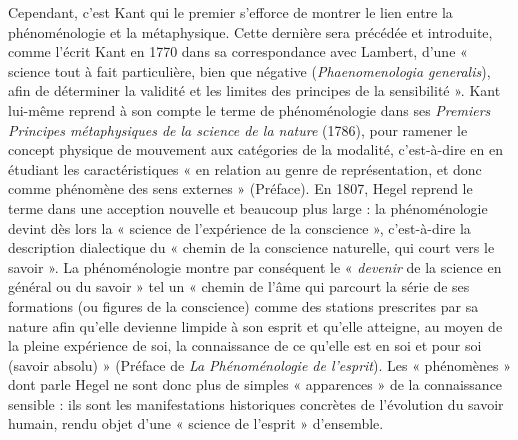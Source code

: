 Cependant, c’est Kant qui le premier
s’efforce de montrer le lien entre la phénoménologie
et la métaphysique. Cette
dernière sera précédée et introduite,
comme l'écrit Kant en 1770 dans sa correspondance
avec Lambert, d’une
« science tout à fait particulière, bien que
négative ({\it Phaenomenologia  generalis}),
afin de déterminer la validité et les limites
des principes de la sensibilité ». Kant lui-même
reprend à son compte le terme de
phénoménologie dans ses {\it Premiers Principes
métaphysiques de la science de la
nature} (1786), pour ramener le concept
physique de mouvement aux catégories
de la modalité, c’est-à-dire en en étudiant
les caractéristiques « en relation au genre
de représentation, et donc comme phénomène
des sens externes » (Préface). En
1807, Hegel reprend le terme dans une
acception nouvelle et beaucoup plus
large : la phénoménologie devint dès lors
la « science de l’expérience de la
conscience », c’est-à-dire la description
dialectique du « chemin de la conscience
naturelle, qui court vers le savoir ». La
phénoménologie montre par conséquent
le « {\it devenir} de la science en général ou
du savoir » tel un « chemin de l’âme qui
parcourt la série de ses formations (ou
figures de la conscience) comme des stations
prescrites par sa nature afin qu’elle
devienne limpide à son esprit et qu’elle
atteigne, au moyen de la pleine expérience
de soi, la connaissance de ce qu’elle
est en soi et pour soi (savoir absolu) »
(Préface de {\it La Phénoménologie de l'esprit}).
Les « phénomènes » dont parle
Hegel ne sont donc plus de simples « apparences »
de la connaissance sensible : ils
sont les manifestations historiques
concrètes de l’évolution du savoir
humain, rendu objet d’une « science de
l'esprit » d'ensemble.

